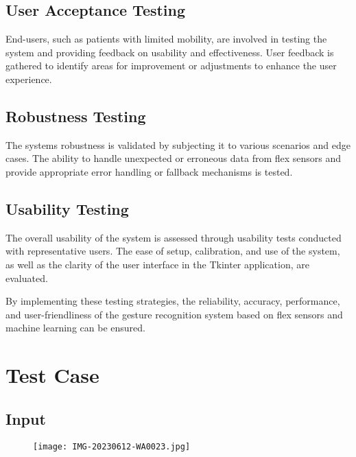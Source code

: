 \documentclass[a4paper,12pt,oneside]{report}
\begin{document}
\subsection{User Acceptance Testing}
End-users, such as patients with limited
mobility, are involved in testing the system and providing feedback
on usability and effectiveness. User feedback is gathered to
identify areas for improvement or adjustments to enhance the user
experience.
\subsection{Robustness Testing}
The systems robustness is validated by
subjecting it to various scenarios and edge cases. The ability to
handle unexpected or erroneous data from flex sensors and
provide appropriate error handling or fallback mechanisms is
tested.
\subsection{Usability Testing}
The overall usability of the system is assessed
through usability tests conducted with representative users. The
ease of setup, calibration, and use of the system, as well as the
clarity of the user interface in the Tkinter application, are
evaluated.
\vspace{\baselineskip}


By implementing these testing strategies, the reliability, accuracy,
performance, and user-friendliness of the gesture recognition system
based on flex sensors and machine learning can be ensured.

\section{Test Case}
\subsection{Input}
 \begin{figure}[h]
    \centering
    \begin{minipage}{0.5\textwidth}
        \centering
        \texttt{[image: IMG-20230612-WA0023.jpg]}
        \label{fig:flex-sensor}
    \end{minipage}
\end{figure}
\end{document}
